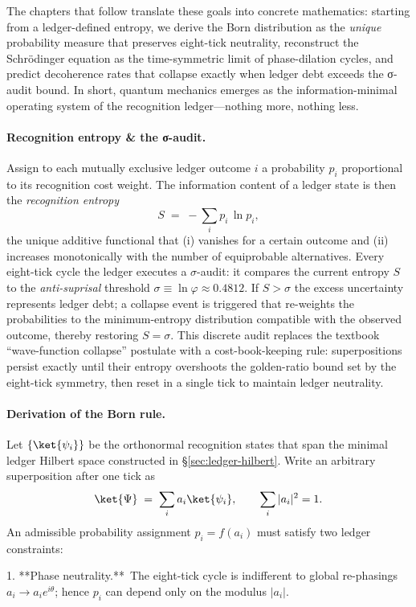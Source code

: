 \documentclass[11pt,oneside]{book}
\begin{document}
The chapters that follow translate these goals into concrete mathematics:
starting from a ledger-defined entropy, we derive the Born distribution
as the \emph{unique} probability measure that preserves eight-tick
neutrality, reconstruct the Schrödinger equation as the time-symmetric
limit of phase-dilation cycles, and predict decoherence rates that
collapse exactly when ledger debt exceeds the σ-audit bound.  In short,
quantum mechanics emerges as the information-minimal operating system
of the recognition ledger—nothing more, nothing less.

\paragraph*{Recognition entropy \& the σ-audit.}
Assign to each mutually exclusive ledger outcome \(i\) a probability
\(p_i\) proportional to its recognition cost weight.  The information
content of a ledger state is then the \emph{recognition entropy}
\[
   S
   \;=\;
   -\sum_{i} p_i \,\ln p_i ,
\]
the unique additive functional that (i) vanishes for a certain outcome
and (ii) increases monotonically with the number of equiprobable
alternatives.  Every eight-tick cycle the ledger executes a
\(\sigma\)-audit: it compares the current entropy \(S\) to the
\emph{anti-suprisal} threshold
\(\sigma \equiv \ln\varphi \approx 0.4812\).
If \(S>\sigma\) the excess uncertainty represents ledger debt; a
collapse event is triggered that re-weights the probabilities to the
minimum-entropy distribution compatible with the observed outcome,
thereby restoring \(S=\sigma\).  This discrete audit replaces the
textbook “wave-function collapse” postulate with a
cost-book-keeping rule: superpositions persist exactly until their
entropy overshoots the golden-ratio bound set by the eight-tick
symmetry, then reset in a single tick to maintain ledger neutrality.

\paragraph*{Derivation of the Born rule.}
Let \(\{\ket{\psi_i}\}\) be the orthonormal recognition states that
span the minimal ledger Hilbert space constructed in §\ref{sec:ledger-hilbert}.  
Write an arbitrary superposition after one tick as  
\[
   \ket{\Psi}
   \;=\;
   \sum_i a_i \ket{\psi_i},
   \qquad
   \sum_i |a_i|^2 = 1 .
\]
An admissible probability assignment \(p_i = f(a_i)\) must satisfy two
ledger constraints:

1. **Phase neutrality.** The eight-tick cycle is indifferent to global
   re-phasings \(a_i \!\to\! a_i e^{i\theta}\); hence \(p_i\) can depend
   only on the modulus \(|a_i|\).
\end{document}
